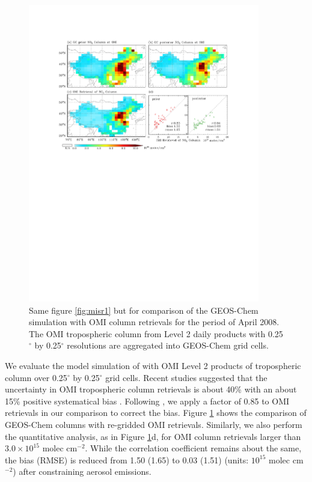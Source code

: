  \begin{figure}[t]
  \centering
  \includegraphics[width={0.9\textwidth}]{figures/a9.pdf}
  \caption{Same figure \ref{fig:misr1} but for comparison of the GEOS-Chem  simulation with OMI column  retrievals for the period of April 2008.  The OMI tropospheric column  from Level 2 daily products with 0.25$^{\circ}$ by 0.25$^{\circ}$ resolutions are aggregated into GEOS-Chem grid cells.}
  \label{fig:omno2}
 \end{figure}

 We evaluate the model simulation of  with OMI Level 2 products of
  tropospheric column over 0.25$^{\circ}$ by 0.25$^{\circ}$ grid cells.
 Recent studies suggested that the uncertainty in OMI  tropospheric column retrievals
 is about 40\% with an about 15\% positive systematical bias \citep{Boersma08,Celarier08}.
 Following \citet{Lin10}, we apply a factor of 0.85 to OMI  retrievals
 in our comparison to correct the bias.
 Figure \ref{fig:omno2} shows the comparison of GEOS-Chem  columns
 with re-gridded OMI  retrievals.
 Similarly, we also perform the quantitative analysis, as in Figure \ref{fig:omno2}d,
 for OMI  column retrievals larger than $3.0 \times 10^{15}$ molec cm$^{-2}$.
 While the correlation coefficient remains about the same, the bias (RMSE) is reduced
 from 1.50 (1.65) to 0.03 (1.51) (units: $10^{15}$ molec cm$^{-2}$) after constraining aerosol emissions. 

